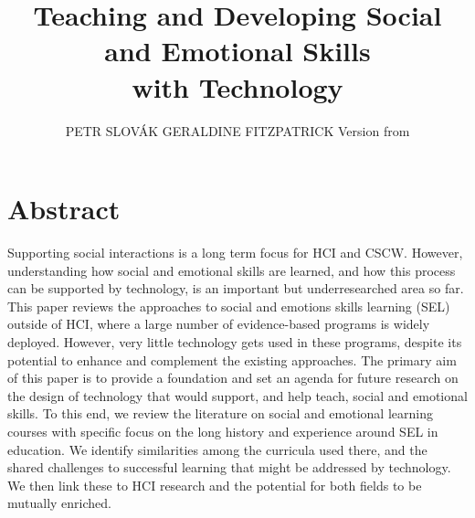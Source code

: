 \documentclass[prodmode,acmtochi]{acmsmall}
\begin{document}



\title{Teaching and Developing Social and Emotional Skills \\ with Technology} 
\author{PETR SLOV\'{A}K %
 GERALDINE FITZPATRICK 
Version from \affil{ \today, \currenttime }
	}
        

\maketitle

\section*{Abstract} 
Supporting social interactions is a long term focus for HCI and CSCW. However, understanding how social and emotional skills are learned, and how this process can be supported by technology, is an important but underresearched area so far. 
% 
This paper reviews the approaches to social and emotions skills learning (SEL) outside of HCI, where a large number of evidence-based programs is widely deployed. However, very little technology gets used in these programs, despite its potential to enhance and complement the existing approaches.  
%
%
The primary aim of this paper is to provide a foundation and set an agenda
for future research on the design of technology that would support, and help
teach, social and emotional skills. To this end, we review the literature on social and emotional learning courses with specific focus on the long history and experience around SEL in education. We identify similarities among the curricula used there, and the shared challenges to successful learning that might be addressed by technology. We then link these to HCI research and the potential for both fields to be mutually enriched. 
\end{document}
